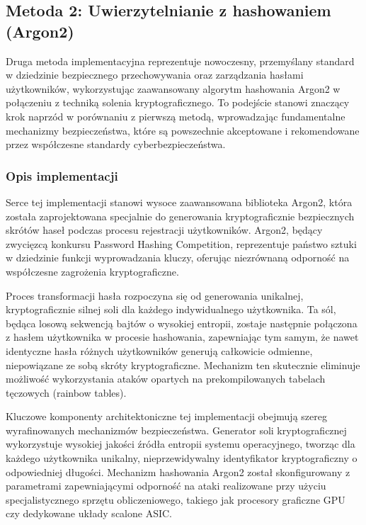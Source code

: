 \documentclass{article}
\begin{document}
\subsection{Metoda 2: Uwierzytelnianie z hashowaniem (Argon2)}

Druga metoda implementacyjna reprezentuje nowoczesny, przemyślany standard w dziedzinie bezpiecznego przechowywania oraz zarządzania hasłami użytkowników, wykorzystując zaawansowany algorytm hashowania Argon2 w połączeniu z techniką solenia kryptograficznego. To podejście stanowi znaczący krok naprzód w porównaniu z pierwszą metodą, wprowadzając fundamentalne mechanizmy bezpieczeństwa, które są powszechnie akceptowane i rekomendowane przez współczesne standardy cyberbezpieczeństwa.

\subsubsection{Opis implementacji}
Serce tej implementacji stanowi wysoce zaawansowana biblioteka Argon2, która została zaprojektowana specjalnie do generowania kryptograficznie bezpiecznych skrótów haseł podczas procesu rejestracji użytkowników. Argon2, będący zwycięzcą konkursu Password Hashing Competition, reprezentuje państwo sztuki w dziedzinie funkcji wyprowadzania kluczy, oferując niezrównaną odporność na współczesne zagrożenia kryptograficzne.

Proces transformacji hasła rozpoczyna się od generowania unikalnej, kryptograficznie silnej soli dla każdego indywidualnego użytkownika. Ta sól, będąca losową sekwencją bajtów o wysokiej entropii, zostaje następnie połączona z hasłem użytkownika w procesie hashowania, zapewniając tym samym, że nawet identyczne hasła różnych użytkowników generują całkowicie odmienne, niepowiązane ze sobą skróty kryptograficzne. Mechanizm ten skutecznie eliminuje możliwość wykorzystania ataków opartych na prekompilowanych tabelach tęczowych (rainbow tables).

Kluczowe komponenty architektoniczne tej implementacji obejmują szereg wyrafinowanych mechanizmów bezpieczeństwa. Generator soli kryptograficznej wykorzystuje wysokiej jakości źródła entropii systemu operacyjnego, tworząc dla każdego użytkownika unikalny, nieprzewidywalny identyfikator kryptograficzny o odpowiedniej długości. Mechanizm hashowania Argon2 został skonfigurowany z parametrami zapewniającymi odporność na ataki realizowane przy użyciu specjalistycznego sprzętu obliczeniowego, takiego jak procesory graficzne GPU czy dedykowane układy scalone ASIC.
\end{document}
